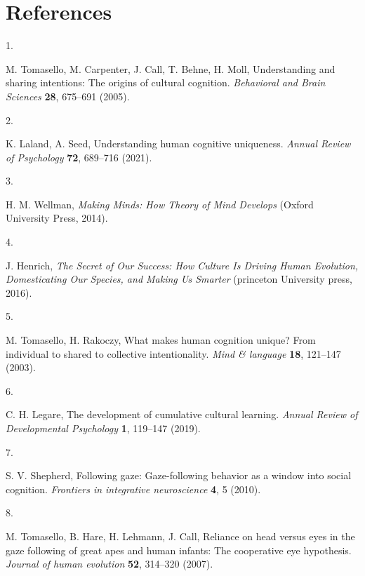 \documentclass[
  man,floatsintext]{apa6}
\newlength{\cslhangindent}
\newlength{\csllabelwidth}
\newlength{\cslentryspacingunit} %
\newenvironment{CSLReferences}[2] %
 {%
  \setlength{\parindent}{0pt}
  \ifodd #1
  \let\oldpar\par
  \def\par{\hangindent=\cslhangindent\oldpar}
  \fi
  \setlength{\parskip}{#2\cslentryspacingunit}
 }%
 {}
\newcommand{\CSLLeftMargin}[1]{\parbox[t]{\csllabelwidth}{#1}}
\newcommand{\CSLRightInline}[1]{\parbox[t]{\linewidth - \csllabelwidth}{#1}\break}
\begin{document}
\newpage

\hypertarget{references}{%
\section{References}\label{references}}

\hypertarget{refs}{}
\begin{CSLReferences}{0}{0}
\leavevmode{}%
\CSLLeftMargin{1. }%
\CSLRightInline{M. Tomasello, M. Carpenter, J. Call, T. Behne, H. Moll, Understanding and sharing intentions: The origins of cultural cognition. \emph{Behavioral and Brain Sciences} \textbf{28}, 675--691 (2005).}

\leavevmode{}%
\CSLLeftMargin{2. }%
\CSLRightInline{K. Laland, A. Seed, Understanding human cognitive uniqueness. \emph{Annual Review of Psychology} \textbf{72}, 689--716 (2021).}

\leavevmode{}%
\CSLLeftMargin{3. }%
\CSLRightInline{H. M. Wellman, \emph{Making Minds: How Theory of Mind Develops} (Oxford University Press, 2014).}

\leavevmode{}%
\CSLLeftMargin{4. }%
\CSLRightInline{J. Henrich, \emph{The Secret of Our Success: How Culture Is Driving Human Evolution, Domesticating Our Species, and Making Us Smarter} (princeton University press, 2016).}

\leavevmode{}%
\CSLLeftMargin{5. }%
\CSLRightInline{M. Tomasello, H. Rakoczy, What makes human cognition unique? From individual to shared to collective intentionality. \emph{Mind \& language} \textbf{18}, 121--147 (2003).}

\leavevmode{}%
\CSLLeftMargin{6. }%
\CSLRightInline{C. H. Legare, The development of cumulative cultural learning. \emph{Annual Review of Developmental Psychology} \textbf{1}, 119--147 (2019).}

\leavevmode{}%
\CSLLeftMargin{7. }%
\CSLRightInline{S. V. Shepherd, Following gaze: Gaze-following behavior as a window into social cognition. \emph{Frontiers in integrative neuroscience} \textbf{4}, 5 (2010).}

\leavevmode{}%
\CSLLeftMargin{8. }%
\CSLRightInline{M. Tomasello, B. Hare, H. Lehmann, J. Call, Reliance on head versus eyes in the gaze following of great apes and human infants: The cooperative eye hypothesis. \emph{Journal of human evolution} \textbf{52}, 314--320 (2007).}


\end{CSLReferences}
\end{document}
